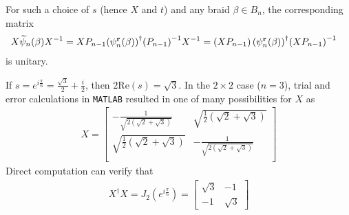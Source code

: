 For such a choice of $s$ (hence $X$ and $t$) and any braid $\beta\in B_n$, the corresponding matrix
\begin{align*}
    X\widetilde{\psi}_n(\beta){ X }^{-1} &= X P_{n-1}{\left(\psi_n^\mathbf{r}(\beta)\right)}^\dagger{ \left( P_{n-1} \right) }^{-1}{ X }^{-1} = \left( X P_{n-1} \right){\left(\psi_n^\mathbf{r}(\beta)\right)}^\dagger{ \left( X P_{n-1} \right) }^{-1}
\end{align*}
is unitary.

\begin{example}
    If $s=e^{i\frac{\pi}{6}}=\frac{\sqrt{3}}{2} + \frac{i}{2}$, then $2\textrm{Re}(s) = \sqrt{3}$. In the $2\times 2$ case ($n=3$), trial and error calculations in \texttt{MATLAB} resulted in one of many possibilities for $X$ as
    \begin{align*}
        X = \left[
            \begin{array}{cc}
            -\frac{1}{\sqrt{2 \left(\sqrt{2}+\sqrt{3}\right)}} & \sqrt{\frac{1}{2} \left(\sqrt{2}+\sqrt{3}\right)} \\
            \sqrt{\frac{1}{2} \left(\sqrt{2}+\sqrt{3}\right)} & -\frac{1}{\sqrt{2 \left(\sqrt{2}+\sqrt{3}\right)}} \\
            \end{array}
            \right]
    \end{align*}
    Direct computation can verify that
    \begin{align*}
        X^\dagger X = J_{2}(e^{i\frac{\pi}{6}}) = \left[\begin{array}{cc} \sqrt{3} & -1\\ -1 & \sqrt{3} \end{array}\right]
    \end{align*}


\end{example}

